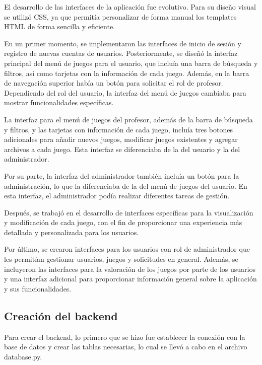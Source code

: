 El desarrollo de las interfaces de la aplicación fue evolutivo. Para su diseño visual se utilizó CSS, ya que permitía personalizar de forma manual los templates HTML de forma sencilla y eficiente.

En un primer momento, se implementaron las interfaces de inicio de sesión y registro de nuevas cuentas de usuarios. Posteriormente, se diseñó la interfaz principal del menú de juegos para el usuario, que incluía una barra de búsqueda y filtros, así como tarjetas con la información de cada juego. Además, en la barra de navegación superior había un botón para solicitar el rol de profesor. Dependiendo del rol del usuario, la interfaz del menú de juegos cambiaba para mostrar funcionalidades específicas.

La interfaz para el menú de juegos del profesor, además de la barra de búsqueda y filtros, y las tarjetas con información de cada juego, incluía tres botones adicionales para añadir nuevos juegos, modificar juegos existentes y agregar archivos a cada juego. Esta interfaz se diferenciaba de la del usuario y la del administrador.

Por su parte, la interfaz del administrador también incluía un botón para la administración, lo que la diferenciaba de la del menú de juegos del usuario. En esta interfaz, el administrador podía realizar diferentes tareas de gestión.

Después, se trabajó en el desarrollo de interfaces específicas para la visualización y modificación de cada juego, con el fin de proporcionar una experiencia más detallada y personalizada para los usuarios.

Por último, se crearon interfaces para los usuarios con rol de administrador que les permitían gestionar usuarios, juegos y solicitudes en general. Además, se incluyeron las interfaces para la valoración de los juegos por parte de los usuarios y una interfaz adicional para proporcionar información general sobre la aplicación y sus funcionalidades.
    
\subsection{Creación del backend}
Para crear el backend, lo primero que se hizo fue establecer la conexión con la base de datos y crear las tablas necesarias, lo cual se llevó a cabo en el archivo database.py. 

